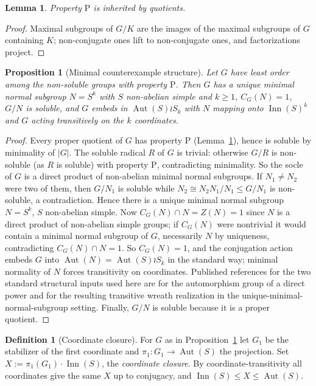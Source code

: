 \documentclass[11pt]{amsart}
\newtheorem{lemma}[theorem]{Lemma}
\newtheorem{proposition}[theorem]{Proposition}
\theoremstyle{definition}
\newtheorem{definition}[theorem]{Definition}
\theoremstyle{remark}
\DeclareMathOperator{\Inn}{Inn}
\DeclareMathOperator{\Aut}{Aut}
\begin{document}
\begin{lemma}\label{lem:quot}
Property $\mathrm{P}$ is inherited by quotients.
\end{lemma}

\begin{proof}
Maximal subgroups of $G/K$ are the images of the maximal subgroups of $G$
containing $K$; non-conjugate ones lift to non-conjugate ones, and
factorizations project.
\end{proof}

\begin{proposition}[Minimal counterexample structure]\label{prop:min}
Let $G$ have least order among the non-soluble groups with property
$\mathrm{P}$.
Then $G$ has a unique minimal normal subgroup $N=S^k$ with $S$ non-abelian
simple and $k\geq 1$, $C_G(N)=1$, $G/N$ is soluble, and $G$ embeds in
$\Aut(S)\wr S_k$ with $N$ mapping onto $\Inn(S)^k$ and $G$ acting
transitively on the $k$ coordinates.
\end{proposition}

\begin{proof}
Every proper quotient of $G$ has property $\mathrm{P}$
(Lemma~\ref{lem:quot}), hence is soluble by minimality of $|G|$. The
soluble radical $R$ of $G$ is trivial: otherwise $G/R$ is non-soluble
(as $R$ is soluble) with property $\mathrm{P}$, contradicting minimality.
So the socle of $G$ is a direct product of non-abelian minimal normal
subgroups. If $N_1\neq N_2$ were two of them, then $G/N_1$ is soluble
while $N_2\cong N_2N_1/N_1\leq G/N_1$ is non-soluble, a contradiction.
Hence there is a unique minimal normal subgroup $N=S^k$, $S$ non-abelian
simple. Now $C_G(N)\cap N=Z(N)=1$ since $N$ is a direct product of
non-abelian simple groups; if $C_G(N)$ were nontrivial it would contain
a minimal normal subgroup of $G$, necessarily $N$ by uniqueness,
contradicting $C_G(N)\cap N=1$. So $C_G(N)=1$, and the conjugation
action embeds $G$ into $\Aut(N)=\Aut(S)\wr S_k$ in the standard way;
minimal normality of $N$ forces transitivity on coordinates. Published
references for the two standard
structural inputs used here are \cite[Lemma~2.10, pp.~173--174]{ZhangShi2009}
for the automorphism group of a direct power and
\cite[p.~432]{LucchiniMorini2002} for the resulting transitive wreath
realization in the unique-minimal-normal-subgroup setting. Finally, $G/N$ is
soluble because it is a proper quotient.
\end{proof}

\begin{definition}[Coordinate closure]\label{def:X}
For $G$ as in Proposition~\ref{prop:min} let $G_1$ be the stabilizer of
the first coordinate and $\pi_1\colon G_1\to\Aut(S)$ the projection. Set
$X:=\pi_1(G_1)\cdot\Inn(S)$, the \emph{coordinate closure}. By
coordinate-transitivity all coordinates give the same $X$ up to conjugacy,
and $\Inn(S)\leq X\leq\Aut(S)$.
\end{definition}
\end{document}
